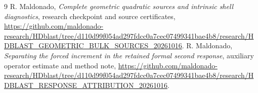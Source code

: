 \documentclass[11pt]{article}
\begin{document}
\begin{thebibliography}{9}
 R. Maldonado, \emph{Complete geometric quadratic sources and
intrinsic shell diagnostics}, research checkpoint and source certificates,
\url{https://github.com/maldonado-research/HDblast/tree/d110d99f054ad297fdcc0a7cec07499341bae4b8/research/HDBLAST_GEOMETRIC_BULK_SOURCES_20261016}.
 R. Maldonado, \emph{Separating the forced increment in the
retained formal second response}, auxiliary operator estimate and method note,
\url{https://github.com/maldonado-research/HDblast/tree/d110d99f054ad297fdcc0a7cec07499341bae4b8/research/HDBLAST_RESPONSE_ATTRIBUTION_20261016}.
\end{thebibliography}
\end{document}
